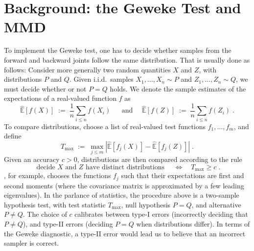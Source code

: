 \documentclass{article}
\begin{document}
\section{Background: the Geweke Test and MMD}\label{sec:background}

To implement the Geweke test, one has to decide whether samples from the forward
and backward joints follow the same distribution. 
That is usually done as follows: 
Consider more generally two 
random quantities $X$ and $Z$, with distributions $P$ and $Q$.
Given i.i.d.\ samples
${X_1,\ldots,X_n\sim P}$ and ${Z_1,\ldots,Z_n\sim Q}$, we must decide
whether or not $P=Q$ holds.
We denote the sample estimates of the expectations of a real-valued
function $f$ as
\begin{equation*}
  \hat{\mathbb{E}}[f(X)]\;:=\;\frac{1}{n}\sum_{i\leq n}f(X_i)\;
  \quad\text{ and }\quad
  \hat{\mathbb{E}}[f(Z)]\;:=\;\frac{1}{n}\sum_{i\leq n}f(Z_i)\;.
\end{equation*}
To compare distributions, choose a list of real-valued test functions
${f_1,\ldots,f_m}$, and define
\begin{equation*}
  T_{\text{max}}\;:=\;\max_{j\leq m}|\hat{\mathbb{E}}[f_j(X)]-\hat{\mathbb{E}}[f_j(Z)]|\;.
\end{equation*}
Given an accuracy ${c>0}$, distributions are then compared 
according to the rule
\begin{equation*}
  \text{ decide }X \text{ and } Z \text{ have distinct distributions }
  \quad\Longleftrightarrow\quad
  T_{\text{max}}\geq c\;.
\end{equation*}
\citet{geweke_getting_2004}, for example, chooses the functions
$f_j$ such that their expectations are first and second moments (where
the covariance matrix is approximated by a few leading eigenvalues).
In the parlance of statistics, the procedure above is a two-sample
hypothesis test, with test statistic $T_{\text{max}}$, null hypothesis
${P=Q}$, and alternative ${P\neq Q}$. The choice of $c$
calibrates between type-I errors (incorrectly deciding that ${P\neq
  Q}$),
and type-II errors (deciding ${P=Q}$ when distributions differ). In
terms of the Geweke diagnostic, a type-II error would lead us to
believe that an incorrect sampler is correct.
\end{document}
